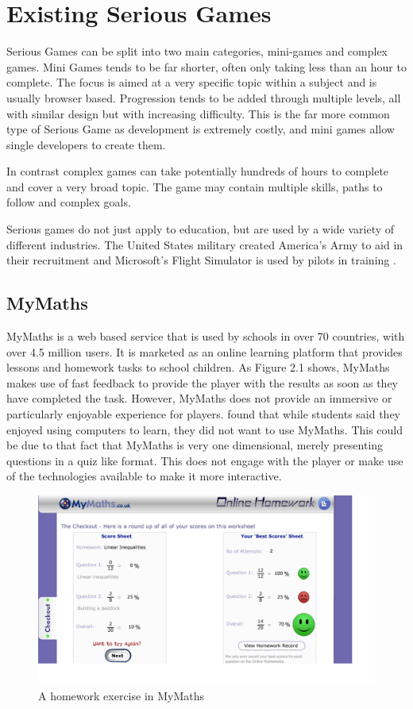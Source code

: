 \documentclass[12pt,a4paper]{report}
\begin{document}
\section{Existing Serious Games}
Serious Games can be split into two main categories, mini-games and complex games. Mini Games tends to be far shorter, often only taking less than an hour to complete. The focus is aimed at a very specific topic within a subject and is usually browser based. Progression tends to be added through multiple levels, all with similar design but with increasing difficulty. This is the far more common type of Serious Game as development is extremely costly, and mini games allow single developers to create them.

In contrast complex games can take potentially hundreds of hours to complete and cover a very broad topic. The game may contain multiple skills, paths to follow and complex goals.  

Serious games do not just apply to education, but are used by a wide variety of different industries. The United States military created America's Army to aid in their recruitment and Microsoft's Flight Simulator is used by pilots in training \citep{111701519980901}.

\subsection{MyMaths}
MyMaths is a web based service that is used by schools in over 70 countries, with over 4.5 million users. It is marketed as an online learning platform that provides lessons and homework tasks to school children.
As Figure 2.1 shows, MyMaths makes use of fast feedback to provide the player with the results as soon as they have completed the task. However, MyMaths does not provide an immersive or particularly enjoyable experience for players. \cite{lee2013learning} found that while students said they enjoyed using computers to learn, they did not want to use MyMaths. This could be due to that fact that MyMaths is very one dimensional, merely presenting questions in a quiz like format. This does not engage with the player or make use of the technologies available to make it more interactive.


\begin{figure}[!tbp]
  \centering
  \begin{minipage}[b]{1\textwidth}
    \includegraphics[width=\textwidth]{mymaths}
    \caption{A homework exercise in MyMaths}
  \end{minipage}
\end{figure}
\FloatBarrier




 
\end{document}
